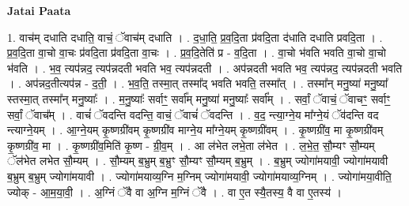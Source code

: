 \documentclass[17pt]{extarticle}
\begin{document}
\textbf{Jatai Paata} \newline

1. वाच॑म् दधाति दधाति॒ वाचं॒ ॅवाच॑म् दधाति । . द॒धा॒ति॒ प्र॒व॒दि॒ता प्र॑वदि॒ता द॑धाति दधाति प्रवदि॒ता । . प्र॒व॒दि॒ता वा॒चो वा॒चः प्र॑वदि॒ता प्र॑वदि॒ता वा॒चः । . प्र॒व॒दि॒तेति॑ प्र - व॒दि॒ता । . वा॒चो भ॑वति भवति वा॒चो वा॒चो भ॑वति । . भ॒व॒ त्यप॑न्नद॒ त्यप॑न्नदती भवति भव॒ त्यप॑न्नदती । . अप॑न्नदती भवति भव॒ त्यप॑न्नद॒ त्यप॑न्नदती भवति । . अप॑न्नद॒तीत्यप॑न्न - द॒ती॒ । . भ॒व॒ति॒ तस्मा॒त् तस्मा᳚द् भवति भवति॒ तस्मा᳚त् । . तस्मा᳚न् मनु॒ष्या॑ मनु॒ष्या᳚ स्तस्मा॒त् तस्मा᳚न् मनु॒ष्याः᳚ । . म॒नु॒ष्याः᳚ सर्वाꣳ॒॒ सर्वा᳚म् मनु॒ष्या॑ मनु॒ष्याः᳚ सर्वा᳚म् । . सर्वां॒ ॅवाचं॒ ॅवाचꣳ॒॒ सर्वाꣳ॒॒ सर्वां॒ ॅवाच᳚म् । . वाचं॑ ॅवदन्ति वदन्ति॒ वाचं॒ ॅवाचं॑ ॅवदन्ति । . व॒द॒ न्त्या॒ग्ने॒य मा᳚ग्ने॒यं ॅव॑दन्ति वद न्त्याग्ने॒यम् । . आ॒ग्ने॒यम् कृ॒ष्णग्री॑वम् कृ॒ष्णग्री॑व माग्ने॒य मा᳚ग्ने॒यम् कृ॒ष्णग्री॑वम् । . कृ॒ष्णग्री॑व॒ मा कृ॒ष्णग्री॑वम् कृ॒ष्णग्री॑व॒ मा । . कृ॒ष्णग्री॑व॒मिति॑ कृ॒ष्ण - ग्री॒व॒म् । . आ ल॑भेत लभे॒ता ल॑भेत । . ल॒भे॒त॒ सौ॒म्यꣳ सौ॒म्यम् ॅल॑भेत लभेत सौ॒म्यम् । . सौ॒म्यम् ब॒भ्रुम् ब॒भ्रुꣳ सौ॒म्यꣳ सौ॒म्यम् ब॒भ्रुम् । . ब॒भ्रुम् ज्योगा॑मयावी॒ ज्योगा॑मयावी ब॒भ्रुम् ब॒भ्रुम् ज्योगा॑मयावी । . ज्योगा॑मयाव्य॒ग्नि म॒ग्निम् ज्योगा॑मयावी॒ ज्योगा॑मयाव्य॒ग्निम् । . ज्योगा॑मया॒वीति॒ ज्योक् - आ॒म॒या॒वी॒ । . अ॒ग्निं ॅवै वा अ॒ग्नि म॒ग्निं ॅवै । . वा ए॒त स्यै॒तस्य॒ वै वा ए॒तस्य॑ । \newline
\end{document}
